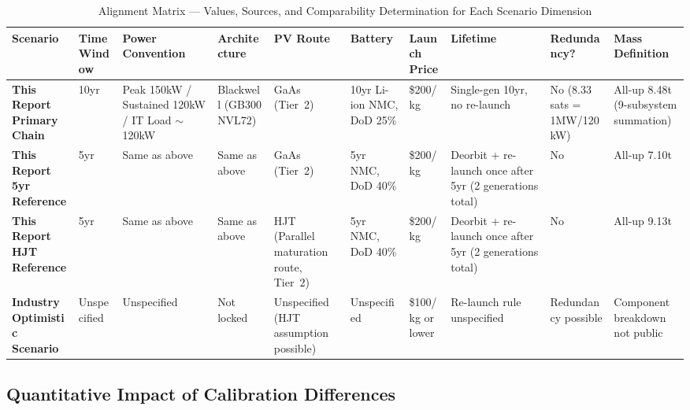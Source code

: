 \begin{table}[H]
  \centering
  \caption{Alignment Matrix --- Values, Sources, and Comparability Determination for Each Scenario Dimension}
  \label{tab:alignment-matrix}
  \scriptsize
  \setlength{\tabcolsep}{1pt}
  \renewcommand{\arraystretch}{1.6}
  \setlength{\extrarowheight}{2pt}
  \begin{tabularx}{\textwidth}{
    >{\hsize=1.40\hsize\raggedright\arraybackslash}X
    >{\hsize=0.50\hsize\centering\arraybackslash}X
    >{\hsize=1.25\hsize\raggedright\arraybackslash}X
    >{\hsize=1.10\hsize\raggedright\arraybackslash}X
    >{\hsize=1.00\hsize\raggedright\arraybackslash}X
    >{\hsize=1.00\hsize\raggedright\arraybackslash}X
    >{\hsize=0.50\hsize\centering\arraybackslash}X
    >{\hsize=1.10\hsize\raggedright\arraybackslash}X
    >{\hsize=0.90\hsize\raggedright\arraybackslash}X
    >{\hsize=1.25\hsize\raggedright\arraybackslash}X
  }
  \toprule
  \textbf{Scenario} & \textbf{Time Window} & \textbf{Power Convention} & \textbf{Architecture} & \textbf{PV Route} & \textbf{Battery} & \textbf{Launch Price} & \textbf{Lifetime} & \textbf{Redundancy?} & \textbf{Mass Definition} \\
  \midrule
  \textbf{This Report Primary Chain} & 10yr & Peak 150kW / Sustained 120kW / IT Load $\sim$120kW & Blackwell (GB300 NVL72) & GaAs (Tier~2) & 10yr Li-ion NMC, DoD 25\% & \$200/kg & Single-gen 10yr, no re-launch & No (8.33 sats = 1MW/120kW) & All-up 8.48t (9-subsystem summation) \\[3pt]
  \textbf{This Report 5yr Reference} & 5yr & Same as above & Same as above & GaAs (Tier~2) & 5yr NMC, DoD 40\% & \$200/kg & Deorbit + re-launch once after 5yr (2 generations total) & No & All-up 7.10t \\[3pt]
  \textbf{This Report HJT Reference} & 5yr & Same as above & Same as above & HJT (Parallel maturation route, Tier~2) & 5yr NMC, DoD 40\% & \$200/kg & Deorbit + re-launch once after 5yr (2 generations total) & No & All-up 9.13t \\[3pt]
  \textbf{Industry Optimistic Scenario} & Unspecified & Unspecified & Not locked & Unspecified (HJT assumption possible) & Unspecified & \$100/kg or lower & Re-launch rule unspecified & Redundancy possible & Component breakdown not public \\
  \bottomrule
  \end{tabularx}
\end{table}

\subsection{Quantitative Impact of Calibration Differences}

